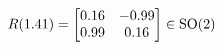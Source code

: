 \documentclass[preview]{standalone}
\begin{document}
\begin{align*}
\special{dvisvgm:raw <g id='unique000'>}R(1.41) = \begin{bmatrix} 0.16 & -0.99 \\ 0.99 & 0.16 \end{bmatrix} \in \text{SO}(2)\special{dvisvgm:raw </g>}
\end{align*}
\end{document}
